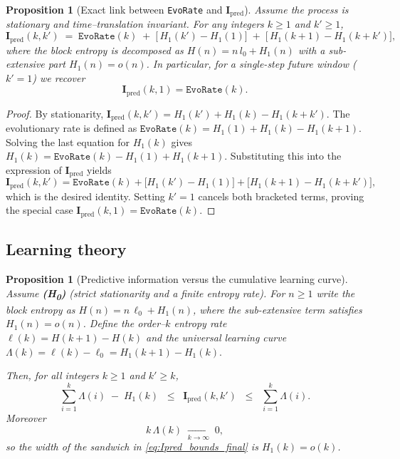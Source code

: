 \documentclass{article}
\newtheorem{proposition}[theorem]{Proposition}
\begin{document}
\begin{proposition}[Exact link between \texttt{EvoRate} and $\mathbf I_{\mathrm{pred}}$]
\label{prop:EvoRate_vs_Ipred}
Assume the process is stationary and time–translation invariant.  
For any integers $k\!\ge1$ and $k'\!\ge1$,
\[
   \mathbf I_{\mathrm{pred}}(k,k')
   \;=\;
   \texttt{EvoRate}(k)
   \;+\;\bigl[\,H_{1}(k')-H_{1}(1)\bigr]
   \;+\;\bigl[\,H_{1}(k+1)-H_{1}(k+k')\bigr],
\]
where the block entropy is decomposed as
$H(n)=n\,l_{0}+H_{1}(n)$ with a sub-extensive part $H_{1}(n)=o(n)$.
In particular, for a single-step future window ($k'=1$) we recover
\[
   \mathbf I_{\mathrm{pred}}(k,1)=\texttt{EvoRate}(k).
\]
\end{proposition}

\begin{proof}
By stationarity,
\(
   \mathbf I_{\mathrm{pred}}(k,k')
   = H_{1}(k')+H_{1}(k)-H_{1}(k+k').
\)
The evolutionary rate is defined as
\(
   \texttt{EvoRate}(k)=H_{1}(1)+H_{1}(k)-H_{1}(k+1).
\)
Solving the last equation for $H_{1}(k)$ gives  
$H_{1}(k)=\texttt{EvoRate}(k)-H_{1}(1)+H_{1}(k+1)$.
Substituting this into the expression of $\mathbf I_{\mathrm{pred}}$
yields
\[
   \mathbf I_{\mathrm{pred}}(k,k')
   =\texttt{EvoRate}(k)
    +\bigl[H_{1}(k')-H_{1}(1)\bigr]
    +\bigl[H_{1}(k+1)-H_{1}(k+k')\bigr],
\]
which is the desired identity.  
Setting $k'=1$ cancels both bracketed terms, proving the special case
$\mathbf I_{\mathrm{pred}}(k,1)=\texttt{EvoRate}(k)$.
\end{proof}




\subsection{Learning theory}

\begin{proposition}[Predictive information versus the cumulative learning curve]
\label{prop:Ipred_vs_Lambda_bounds_corrected}
Assume \textbf{(H\textsubscript{0})} (strict stationarity and a finite
entropy rate).  
For \(n\ge 1\) write the block entropy as \(H(n)=n\,\ell_{0}+H_{1}(n)\),
where the \emph{sub-extensive} term satisfies \(H_{1}(n)=o(n)\).
Define the order–\(k\) entropy rate
\(
  \ell(k)=H(k+1)-H(k)
\)
and the \emph{universal learning curve}
\(
  \Lambda(k)=\ell(k)-\ell_{0}
            =H_{1}(k+1)-H_{1}(k).
\)

Then, for all integers \(k\ge 1\) and \(k'\ge k\),
\begin{equation}\label{eq:Ipred_bounds_final}
   \sum_{i=1}^{k}\Lambda(i)\;-\;H_{1}(k)
   \;\;\le\;\;
   \mathbf I_{\mathrm{pred}}(k,k')
   \;\;\le\;\;
   \sum_{i=1}^{k}\Lambda(i).
\end{equation}
Moreover
\begin{equation}\label{eq:kLambda_limit}
   k\,\Lambda(k)\;\xrightarrow[k\to\infty]{}\;0,
\end{equation}
so the width of the sandwich in \eqref{eq:Ipred_bounds_final} is
\(H_{1}(k)=o(k)\).
\end{proposition}
\end{document}
